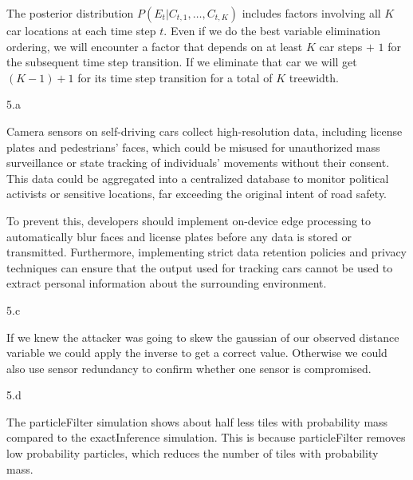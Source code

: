 \begin{answer}
  The posterior distribution $P(E_t | C_{t,1}, \ldots, C_{t,K})$ includes factors involving all $K$ car locations at each time step $t$. Even if we do the best variable elimination ordering, we will encounter a factor that depends on at least $K$ car steps $+$ $1$ for the subsequent time step transition. If we eliminate that car we will get $(K - 1) + 1$ for its time step transition for a total of $K$ treewidth.
\end{answer}
\clearpage


\LARGE
5.a
\normalsize

\begin{answer}
  Camera sensors on self-driving cars collect high-resolution data, including license plates and pedestrians' faces, which could be misused for unauthorized mass surveillance or state tracking of individuals' movements without their consent. This data could be aggregated into a centralized database to monitor political activists or sensitive locations, far exceeding the original intent of road safety.
  
  To prevent this, developers should implement on-device edge processing to automatically blur faces and license plates before any data is stored or transmitted. Furthermore, implementing strict data retention policies and privacy techniques can ensure that the output used for tracking cars cannot be used to extract personal information about the surrounding environment.
\end{answer}
\clearpage

\LARGE
5.c
\normalsize

\begin{answer}
  If we knew the attacker was going to skew the gaussian of our observed distance variable we could apply the inverse to get a correct value. Otherwise we could also use sensor redundancy to confirm whether one sensor is compromised.
\end{answer}
\clearpage

\LARGE
5.d
\normalsize

\begin{answer}
  The particleFilter simulation shows about half less tiles with probability mass compared to the exactInference simulation. This is because particleFilter removes low probability particles, which reduces the number of tiles with probability mass.
\end{answer}
\clearpage


